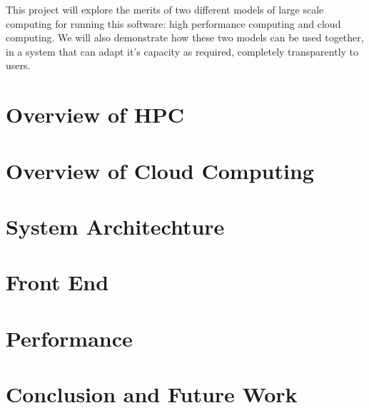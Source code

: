 \documentclass[a4paper]{article}
\begin{document}
This project will explore the merits of two different models of large
scale computing for running this software: high performance computing and
cloud computing. We will also demonstrate how these two models can be used
together, in a system that can adapt it's capacity as required, completely
transparently to users.






\section{Overview of HPC}
\blindtext
\blindtext

\section{Overview of Cloud Computing}
\blindtext
\blindtext

\section{System Architechture}
\blindtext
\blindtext

\section{Front End}
\blindtext
\blindtext

\section{Performance}
\blindtext
\blindtext

\section{Conclusion and Future Work}
\blindtext
\end{document}
